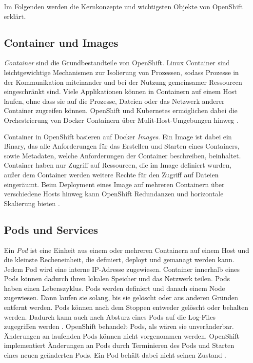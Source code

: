 Im Folgenden werden die Kernkonzepte und wichtigsten Objekte von OpenShift erklärt.
\subsection{Container und Images}
\textit{Container} sind die Grundbestandteile von OpenShift. Linux Container sind leichtgewichtige Mechanismen zur Isolierung von Prozessen, sodass Prozesse in der Kommunikation miteinander und bei der Nutzung gemeinsamer Ressourcen eingeschränkt sind. Viele Applikationen können in Containern auf einem Host laufen, ohne dass sie auf die Prozesse, Dateien oder das Netzwerk anderer Container zugreifen können. OpenShift und Kubernetes ermöglichen dabei die Orchestrierung von Docker Containern über Mulit-Host-Umgebungen hinweg \cite{OpenShiftOnline}.

Container in OpenShift basieren auf Docker \textit{Images}. Ein Image ist dabei ein Binary, das alle Anforderungen für das Erstellen und Starten eines Containers, sowie Metadaten, welche Anforderungen der Container beschreiben, beinhaltet.
Container haben nur Zugriff auf Ressourcen, die im Image definiert wurden, außer dem Container werden weitere Rechte für den Zugriff auf Dateien eingeräumt. Beim Deployment eines Image auf mehreren Containern über verschiedene Hosts hinweg kann OpenShift Redundanzen und horizontale Skalierung bieten \cite{OpenShiftOnline}.

\subsection{Pods und Services}
Ein \textit{Pod} ist eine Einheit aus einem oder mehreren Containern auf einem Host und die kleinste Recheneinheit, die definiert, deployt und gemanagt werden kann. Jedem Pod wird eine interne IP-Adresse zugewiesen. Container innerhalb eines Pods können dadurch ihren lokalen Speicher und das Netzwerk teilen.
Pods haben einen Lebenszyklus. Pods werden definiert und danach einem Node zugewiesen. Dann laufen sie solang, bis sie gelöscht oder aus anderen Gründen entfernt werden. Pods können nach dem Stoppen entweder gelöscht oder behalten werden. Dadurch kann auch nach Absturz eines Pods auf die Log-Files zugegriffen werden \cite{OpenShiftOnline}. OpenShift behandelt Pods, als wären sie unveränderbar. Änderungen an laufenden Pods können nicht vorgenommen werden. OpenShift implementiert Änderungen an Pods durch Terminieren des Pods und Starten eines neuen geänderten Pods. Ein Pod  behält dabei nicht seinen Zustand \cite{OpenShiftOnline}.

